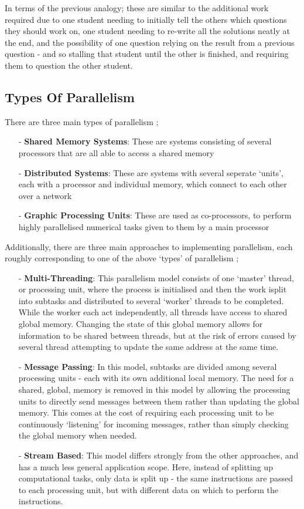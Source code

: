 In terms of the previous analogy; these are similar to the additional work required due to one student needing to initially tell the others which questions they should work on, one student needing to re-write all the solutions neatly at the end, and the possibility of one question relying on the result from a previous question - and so stalling that student until the other is finished, and requiring them to question the other student.

\subsection{Types Of Parallelism}
There are three main types of parallelism \cite{IntroToParComp};
\begin{itemize}
	\item[-]{\textbf{Shared Memory Systems}: These are systems consisting of several processors that are all able to access a shared memory}
	\item[-]{\textbf{Distributed Systems}: These are systems with several seperate `units', each with a processor and individual memory, which connect to each other over a network}
	\item[-]{\textbf{Graphic Processing Units}: These are used as co-processors, to perform highly parallelised numerical tasks given to them by a main processor}
\end{itemize}

Additionally, there are three main approaches to implementing parallelism, each roughly corresponding to one of the above `types' of parallelism \cite{IntroToParComp};
\begin{itemize}
	\item[-]{\textbf{Multi-Threading}: This parallelism model consists of one `master' thread, or processing unit, where the process is initialised and then the work isplit into subtasks and distributed to several `worker' threads to be completed. While the worker each act independently, all threads have access to shared global memory. Changing the state of this global memory allows for information to be shared between threads, but at the risk of errors caused by several thread attempting to update the same address at the same time.}
	\item[-]{\textbf{Message Passing}: In this model, subtasks are divided among several processing units - each with its own additional local memory. The need for a shared, global, memory is removed in this model by allowing the processing units to directly send messages between them rather than updating the global memory. This comes at the cost of requiring each processing unit to be continuously `listening' for incoming messages, rather than simply checking the global memory when needed.}
	\item[-]{\textbf{Stream Based}: This model differs strongly from the other approaches, and has a much less general application scope. Here, instead of splitting up computational tasks, only data is split up - the same instructions are passed to each processing unit, but with different data on which to perform the instructions.}
\end{itemize}

